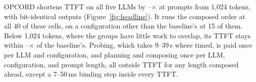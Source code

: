 OPCORD shortens TTFT on all five LLMs by \PrefillGainLo--\PrefillGainHi$\times$ at prompts from 1{,}024 tokens, with bit-identical outputs (Figure~\ref{fig:headline}).
It runs the composed order at all 40 of these cells, on a configuration other than the baseline's at 15 of them.
Below 1{,}024 tokens, where the groups have little work to overlap, its TTFT stays within \ShortGainLo--\ShortGainHi$\times$ of the baseline's.
Probing, which takes 9--39\,s where timed, is paid once per LLM and configuration, and planning and composing once per LLM, configuration, and prompt length, all outside TTFT for any length composed ahead, except a 7--50\,ms binding step inside every TTFT.

